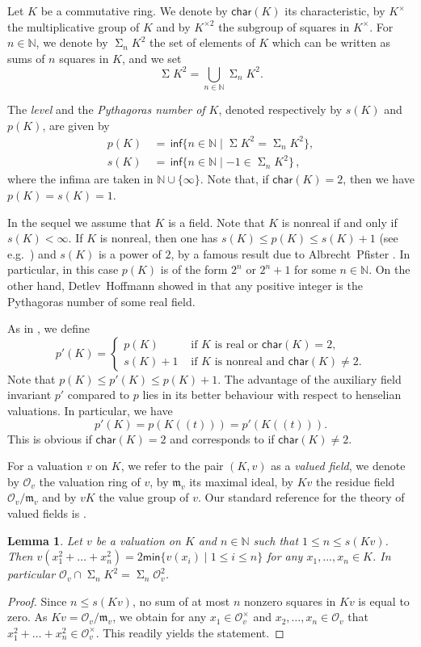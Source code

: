 \documentclass[12pt,leqno]{amsart}
\newcommand{\nat}{\mathbb{N}}
\newcommand{\mc}[1]{\mathcal{#1}}
\newcommand{\mg}[1]{#1^{\times}}
\newcommand{\sq}[1]{#1^{\times 2}}
\DeclareMathOperator{\newsum}{\mathsf{\Sigma}}
\renewcommand{\sum}{\newsum}
\newcommand{\sums}[1]{\sum\!{#1}^2}
\newcommand{\sos}[2]{\sum_{#1}\!{#2}^2}
\newcommand{\mfm}{\mathfrak{m}}
\renewcommand{\inf}{\mathsf{inf}}
\renewcommand{\min}{\mathsf{min}}
\newcommand{\car}{\mathsf{char}}
\renewcommand{\leq}{\leqslant}
\numberwithin{equation}{section}
\newtheorem{lem}[equation]{Lemma}
\theoremstyle{definition}
\theoremstyle{plain}
\begin{document}
Let $K$ be a commutative ring. 
We denote by $\car(K)$ its characteristic, by $\mg{K}$ the multiplicative group of $K$ and by $\sq{K}$ the subgroup of squares in $\mg{K}$.
For $n\in\nat$, we denote by $\sos{n}{K}$ the set of elements of $K$ which can be written as sums of $n$ squares in $K$,
and we set \[\sums{K}=\bigcup_{n\in\nat}\sos{n}{K}.\]

The \emph{level} and the \emph{Pythagoras number of $K$}, denoted respectively by $s(K)$ and $p(K)$, are given by
\begin{align*}p(K) & \,=\,  \inf \{n\in\nat\mid \sums{K}=\sos{n}{K}\},\\
s(K) & \,=\,  \inf \{n\in\nat\mid -1\in\sos{n}{K}\}\,,
\end{align*}
where the infima are taken in $\nat\cup\{\infty\}$.
Note that, if $\car(K)=2$, then we have $p(K)=s(K)=1$.

In the sequel we assume that $K$ is a field.
Note that $K$ is nonreal if and only if $s(K)<\infty$.
If $K$ is nonreal, then one has $s(K)\leq p(K)\leq s(K)+1$ (see e.g.~\cite[Chap.~XI, Theorem 5.6 (2)]{Lam05}) and $s(K)$ is a power of $2$, by a famous result due to Albrecht~Pfister \cite[Chap.~3, Theorem 3.1]{Pfi95}. In particular, in this case $p(K)$ is of the form $2^n$ or $2^n+1$ for some $n\in\nat$.
On the other hand, Detlev~Hoffmann showed in \cite{Hof99} that any positive integer is the Pythagoras number of some real field.

As in \cite[Sect.~4]{BGVG14}, we define
\[p'(K)=\left\{\begin{array}{ll} p(K) & \mbox{ if $K$ is real or $\car(K)=2$},\\ s(K)+1 &\mbox{ if $K$ is nonreal and $\car(K)\neq 2$}.\end{array}\right.\]
Note that $p(K)\leq p'(K)\leq p(K)+1$.
The advantage of the auxiliary field invariant $p'$ compared to $p$ lies in its better behaviour with respect to henselian valuations.
In particular, we have 
\[p'(K)=p(K(\!(t)\!))=p'(K(\!(t)\!)).\]
This is obvious if $\car(K)=2$ and corresponds to \cite[Cor.~4.5]{BGVG14} if $\car(K)\neq 2$.

For a valuation $v$ on $K$, we refer to the pair $(K,v)$ as a \emph{valued field},
we denote by $\mathcal{O}_v$ the valuation ring of $v$, by $\mfm_v$ its maximal ideal, 
by $Kv$ the residue field $\mathcal{O}_v/\mathfrak{m}_v$ and by $vK$ the value group of $v$.
Our standard reference for the theory of valued fields is \cite{EP05}.

\begin{lem}\label{L:valuation-residue-level}
Let $v$ be a valuation on $K$ and 
 $n\in\nat$ such that $1\leq n\leq s(Kv)$.
Then $v(x_1^2+\dots+x_n^2)=2\min\{v(x_i)\mid 1\leq i\leq n\}$ for any $x_1,\dots,x_n\in K$.
In particular $\mc{O}_v\cap\sos{n}{K}=\sos{n}{\mc{O}}_v$.
\end{lem}
\begin{proof}
Since $n\leq s(Kv)$, no sum of at most $n$ nonzero squares in $Kv$ is equal to zero.
As $Kv=\mc{O}_v/\mfm_v$, we obtain for any $x_1\in\mg{\mc{O}}_v$ and $x_2,\dots,x_n\in \mc{O}_v$ that
$x_1^2+\dots+x_n^2\in\mg{\mc{O}}_v$. This readily yields the statement.
\end{proof}
\end{document}
